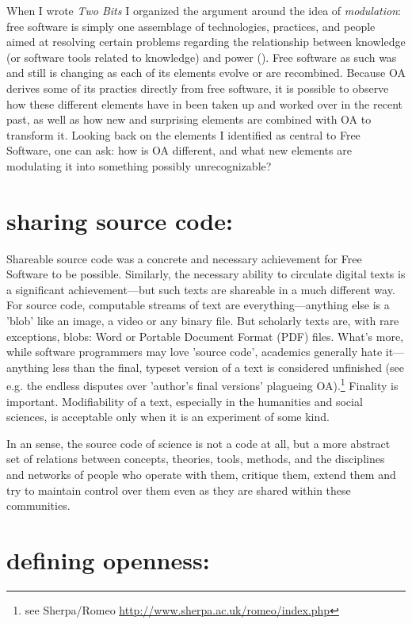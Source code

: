 \documentclass[11pt]{report}
\begin{document}
When I wrote \emph{Two Bits} I organized the argument around the idea of \emph{modulation}: free software is simply one assemblage of technologies, practices, and people aimed at resolving certain problems regarding the  relationship between knowledge (or software tools related to knowledge) and power (\cite{hacking2004histontol,rabinow2003anthtoday}).  Free software as such was and still is changing as each of its elements evolve or are recombined.  Because OA derives some of its practies directly from free software, it is possible to observe how these different elements have in been taken up and worked over in the recent past, as well as how new and surprising elements are combined with OA to transform it.  Looking back on the elements I identified as central to Free Software, one can ask: how is OA different, and what new elements are modulating it into something possibly unrecognizable?  

\section*{\textbf{sharing source code}:}
\label{sec:org68e48c0}
Shareable source code was a concrete and necessary achievement for Free Software to be possible.  Similarly, the necessary ability to circulate digital texts is a significant achievement---but such texts are shareable in a much different way.  For source code, computable streams of text are everything---anything else is a 'blob' like an image, a video or any binary file. But scholarly texts are, with rare exceptions, blobs: Word or Portable Document Format (PDF) files.   What's more, while software programmers may love 'source code', academics generally hate it---anything less than the final, typeset version of a text is considered unfinished (see e.g. the endless disputes over 'author's final versions' plagueing OA).\footnote{see Sherpa/Romeo \url{http://www.sherpa.ac.uk/romeo/index.php}}  Finality is important.  Modifiability of a text, especially in the humanities and social sciences, is acceptable only when it is an experiment of some kind.

In an sense, the source code of science is not a code at all, but a more abstract set of relations between concepts, theories, tools, methods, and the disciplines and networks of people who operate with them, critique them, extend them and try to maintain control over them even as they are shared within these communities. 

\section*{\textbf{defining openness}:}
\label{sec:orga53ad7d}
\end{document}
